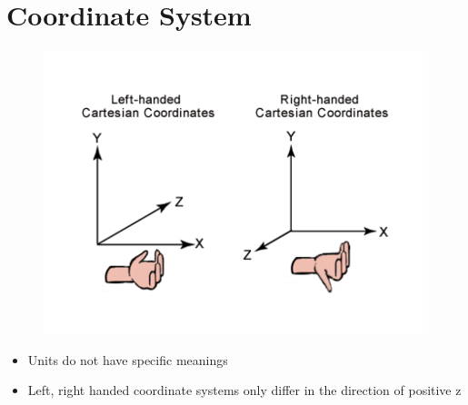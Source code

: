 \section{Coordinate System}

\begin{figure}[H]
  \centering
  \includegraphics[width=0.7\columnwidth]{images/model/left-right-hand.png}
\end{figure}

\begin{itemize}
  \item Units do not have specific meanings
  \item Left, right handed coordinate systems only differ in the direction of
  positive z
\end{itemize}
